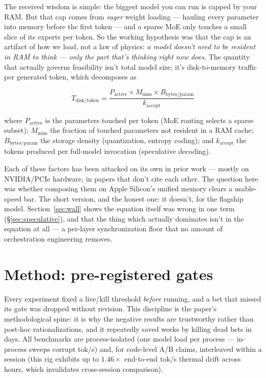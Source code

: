\documentclass[11pt]{article}
\begin{document}
The received wisdom is simple: the biggest model you can run is capped by your RAM. But that cap comes from \emph{eager} weight loading --- hauling every parameter into memory before the first token --- and a sparse MoE only touches a small slice of its experts per token. So the working hypothesis was that the cap is an artifact of how we load, not a law of physics: \emph{a model doesn't need to be resident in RAM to think --- only the part that's thinking right now does.} The quantity that actually governs feasibility isn't total model size; it's disk-to-memory traffic per generated token, which decomposes as

\begin{equation}
T_{\text{disk/token}} = \frac{P_{\text{active}} \times M_{\text{miss}} \times B_{\text{bytes/param}}}{k_{\text{accept}}}
\end{equation}

\noindent where $P_{\text{active}}$ is the parameters touched per token (MoE routing selects a sparse subset); $M_{\text{miss}}$ the fraction of touched parameters not resident in a RAM cache; $B_{\text{bytes/param}}$ the storage density (quantization, entropy coding); and $k_{\text{accept}}$ the tokens produced per full-model invocation (speculative decoding).

Each of these factors has been attacked on its own in prior work --- mostly on NVIDIA/PCIe hardware, in papers that don't cite each other. The question here was whether composing them on Apple Silicon's unified memory clears a usable-speed bar. The short version, and the honest one: it doesn't, for the flagship model. Section~\ref{sec:wall} shows the equation itself was wrong in one term (\S\ref{sec:speculative}), and that the thing which actually dominates isn't in the equation at all --- a per-layer synchronization floor that no amount of orchestration engineering removes.

\section{Method: pre-registered gates}

Every experiment fixed a live/kill threshold \emph{before} running, and a bet that missed its gate was dropped without revision. This discipline is the paper's methodological spine: it is why the negative results are trustworthy rather than post-hoc rationalizations, and it repeatedly saved weeks by killing dead bets in days. All benchmarks are process-isolated (one model load per process --- in-process sweeps corrupt tok/s) and, for code-level A/B claims, interleaved within a session (this rig exhibits up to $1.46\times$ end-to-end tok/s thermal drift across hours, which invalidates cross-session comparison).
\end{document}
